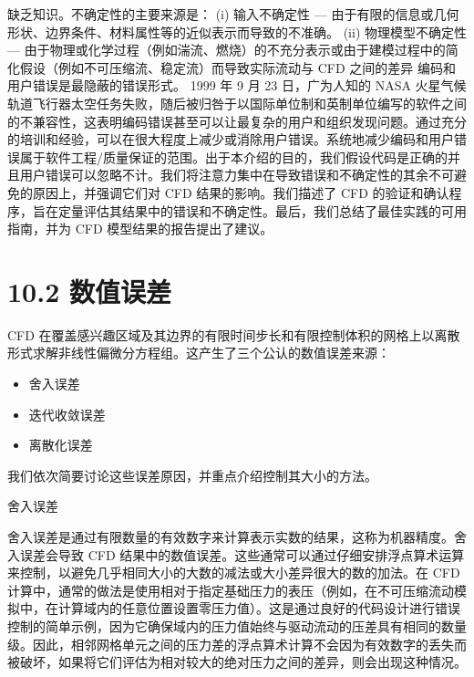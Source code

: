 \documentclass[11pt,a4paper,openany,fontset=none]{ctexbook}
\begin{document}
缺乏知识。不确定性的主要来源是： (i) 输入不确定性 — 由于有限的信息或几何形状、边界条件、材料属性等的近似表示而导致的不准确。 (ii) 物理模型不确定性 — 由于物理或化学过程（例如湍流、燃烧）的不充分表示或由于建模过程中的简化假设（例如不可压缩流、稳定流）而导致实际流动与 CFD 之间的差异
编码和用户错误是最隐蔽的错误形式。 1999 年 9 月 23 日，广为人知的 NASA 火星气候轨道飞行器太空任务失败，随后被归咎于以国际单位制和英制单位编写的软件之间的不兼容性，这表明编码错误甚至可以让最复杂的用户和组织发现问题。通过充分的培训和经验，可以在很大程度上减少或消除用户错误。系统地减少编码和用户错误属于软件工程/质量保证的范围。出于本介绍的目的，我们假设代码是正确的并且用户错误可以忽略不计。我们将注意力集中在导致错误和不确定性的其余不可避免的原因上，并强调它们对 CFD 结果的影响。我们描述了 CFD 的验证和确认程序，旨在定量评估其结果中的错误和不确定性。最后，我们总结了最佳实践的可用指南，并为 CFD 模型结果的报告提出了建议。

\section*{10.2 数值误差}

CFD 在覆盖感兴趣区域及其边界的有限时间步长和有限控制体积的网格上以离散形式求解非线性偏微分方程组。这产生了三个公认的数值误差来源：

\begin{itemize}

\item 舍入误差

\item 迭代收敛误差

\item 离散化误差

\end{itemize}

我们依次简要讨论这些误差原因，并重点介绍控制其大小的方法。

舍入误差

舍入误差是通过有限数量的有效数字来计算表示实数的结果，这称为机器精度。舍入误差会导致 CFD 结果中的数值误差。这些通常可以通过仔细安排浮点算术运算来控制，以避免几乎相同大小的大数的减法或大小差异很大的数的加法。在 CFD 计算中，通常的做法是使用相对于指定基础压力的表压（例如，在不可压缩流动模拟中，在计算域内的任意位置设置零压力值）。这是通过良好的代码设计进行错误控制的简​​单示例，因为它确保域内的压力值始终与驱动流动的压差具有相同的数量级。因此，相邻网格单元之间的压力差的浮点算术计算不会因为有效数字的丢失而被破坏，如果将它们评估为相对较大的绝对压力之间的差异，则会出现这种情况。
\end{document}
